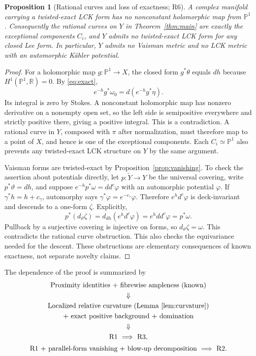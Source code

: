 \documentclass[12pt]{amsart}
\newtheorem{prop}[thm]{Proposition}
\theoremstyle{definition}
\theoremstyle{remark}
\numberwithin{equation}{section}
\newcommand{\R}{\mathbb{R}}
\newcommand{\mP}{\mathbb{P}}
\begin{document}
\begin{prop}[Rational curves and loss of exactness; R6]\label{prop:rational}
A complex manifold carrying a twisted-exact LCK form has no nonconstant holomorphic map from $\mP^1$. Consequently the rational curves on $Y$ in Theorem~\ref{thm:main} are exactly the exceptional components $C_i$, and $Y$ admits no twisted-exact LCK form for \emph{any} closed Lee form. In particular, $Y$ admits no Vaisman metric and no LCK metric with an automorphic K\"ahler potential.
\end{prop}
\begin{proof}
For a holomorphic map $g:\mP^1\to X$, the closed form $g^*\theta$ equals $dh$ because $H^1(\mP^1,\R)=0$. By \eqref{eq:exact},
\[
 e^{-h}g^*\omega_0=d(e^{-h}g^*\eta).
\]
Its integral is zero by Stokes. A nonconstant holomorphic map has nonzero derivative on a nonempty open set, so the left side is semipositive everywhere and strictly positive there, giving a positive integral. This is a contradiction. A rational curve in $Y$, composed with $\pi$ after normalization, must therefore map to a point of $X$, and hence is one of the exceptional components. Each $C_i\simeq\mP^1$ also prevents any twisted-exact LCK structure on $Y$ by the same argument.

Vaisman forms are twisted-exact by Proposition~\ref{prop:vanishing}. To check the assertion about potentials directly, let $p:\widetilde Y\to Y$ be the universal covering, write $p^*\vartheta=dh$, and suppose $e^{-h}p^*\omega=dd^c\varphi$ with an automorphic potential $\varphi$. If $\gamma^*h=h+c_\gamma$, automorphy says $\gamma^*\varphi=e^{-c_\gamma}\varphi$. Therefore $e^h d^c\varphi$ is deck-invariant and descends to a one-form $\zeta$. Explicitly,
\[
 p^*(d_\vartheta\zeta)=d_{dh}(e^h d^c\varphi)
 =e^hdd^c\varphi=p^*\omega.
\]
Pullback by a surjective covering is injective on forms, so $d_\vartheta\zeta=\omega$. This contradicts the rational curve obstruction. This also checks the equivariance needed for the descent. These obstructions are elementary consequences of known exactness, not separate novelty claims.
\end{proof}

The dependence of the proof is summarized by
\[
\begin{gathered}
\text{Proximity identities + fibrewise ampleness (known)}\\
\Downarrow\\
\text{Localized relative curvature (Lemma~\ref{lem:curvature})}\\
+\ \text{exact positive background + domination}\\
\Downarrow\\
\text{R1}\ \Longrightarrow\ \text{R3},\\[2pt]
\text{R1 + parallel-form vanishing + blow-up decomposition}
\ \Longrightarrow\ \text{R2}.
\end{gathered}
\]
\end{document}
